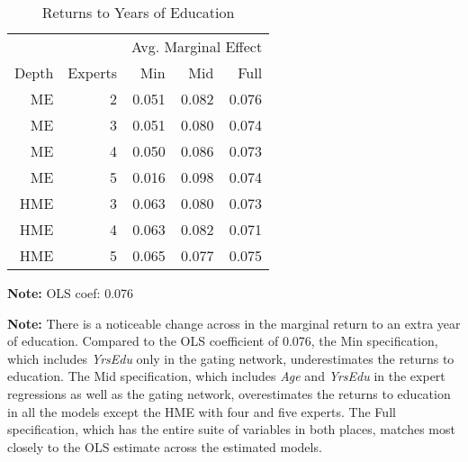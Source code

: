 \documentclass[12pt]{article}
\theoremstyle{definition}
\begin{document}
\begin{table}[t!] \centering
  \caption{Returns to Years of Education}
  \begin{threeparttable}
    \begin{tabular}[l]{r r r r r}
  \cmidrule{1-5}
        &         & \multicolumn{3}{c}{Avg. Marginal Effect} \\ 
  \cmidrule(r){3-5}
  Depth & Experts & Min   & Mid   & Full      \\
  \cmidrule{1-5}

  ME      & 2     & 0.051 & 0.082 & 0.076     \\
  ME      & 3     & 0.051 & 0.080 & 0.074     \\ 
  ME      & 4     & 0.050 & 0.086 & 0.073     \\
  ME      & 5     & 0.016 & 0.098 & 0.074     \\
  HME     & 3     & 0.063 & 0.080 & 0.073     \\
  HME     & 4     & 0.063 & 0.082 & 0.071     \\
  HME     & 5     & 0.065 & 0.077 & 0.075     \\

  \hline
    \end{tabular}
    \begin{tablenotes}
      \item{\footnotesize \textbf{Note:} OLS coef: 0.076}
      \item{\footnotesize \textbf{Note:} There is a noticeable change across in the marginal return to an extra year of education.
      Compared to the OLS coefficient of 0.076, the Min specification, which includes \textit{YrsEdu} only in the gating network, underestimates the returns to education.
      The Mid specification, which includes \textit{Age} and \textit{YrsEdu} in the expert regressions as well as the gating network, overestimates the returns to education in all the models except the HME with four and five experts.
      The Full specification, which has the entire suite of variables in both places, matches most closely to the OLS estimate across the estimated models.}
    \end{tablenotes} \label{tbl:YrsEdu_coef}
  \end{threeparttable}
\end{table}

\bigskip
\end{document}
